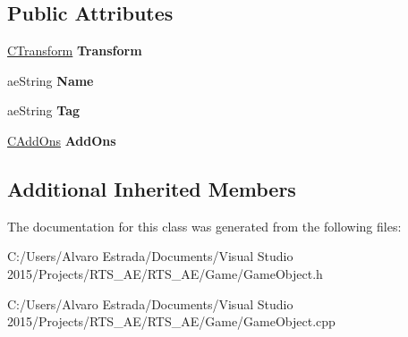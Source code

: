 \subsection*{Public Attributes}
\begin{DoxyCompactItemize}
\item 
\hyperlink{class_c_transform}{C\+Transform} {\bfseries Transform}\hypertarget{class_c_game_object_a622eef6ef28ba335f84918163da3fa5b}{}\label{class_c_game_object_a622eef6ef28ba335f84918163da3fa5b}

\item 
ae\+String {\bfseries Name}\hypertarget{class_c_game_object_ac65f2467bc2141ba5da7a0069d2ef503}{}\label{class_c_game_object_ac65f2467bc2141ba5da7a0069d2ef503}

\item 
ae\+String {\bfseries Tag}\hypertarget{class_c_game_object_a83ceec9704fb65e52d5f642d2b19d9f9}{}\label{class_c_game_object_a83ceec9704fb65e52d5f642d2b19d9f9}

\item 
\hyperlink{_base_class_8h_a128c38fe5df87c45d486902d7c101584}{C\+Add\+Ons} {\bfseries Add\+Ons}\hypertarget{class_c_game_object_a7b3b3e4d86ee56a71c0c429b790528df}{}\label{class_c_game_object_a7b3b3e4d86ee56a71c0c429b790528df}

\end{DoxyCompactItemize}
\subsection*{Additional Inherited Members}


The documentation for this class was generated from the following files\+:\begin{DoxyCompactItemize}
\item 
C\+:/\+Users/\+Alvaro Estrada/\+Documents/\+Visual Studio 2015/\+Projects/\+R\+T\+S\+\_\+\+A\+E/\+R\+T\+S\+\_\+\+A\+E/\+Game/Game\+Object.\+h\item 
C\+:/\+Users/\+Alvaro Estrada/\+Documents/\+Visual Studio 2015/\+Projects/\+R\+T\+S\+\_\+\+A\+E/\+R\+T\+S\+\_\+\+A\+E/\+Game/Game\+Object.\+cpp\end{DoxyCompactItemize}
